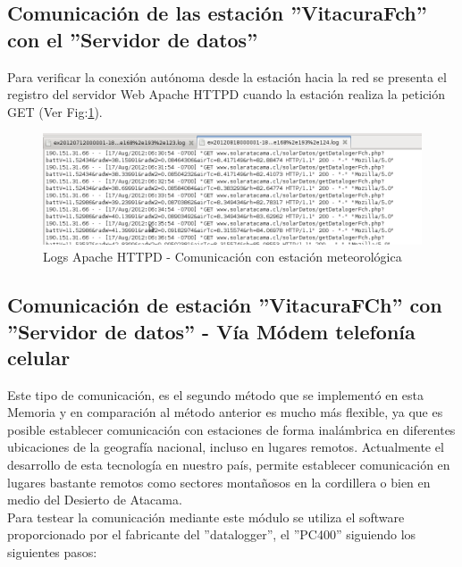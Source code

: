 \subsection{Comunicación de las estación ''VitacuraFch'' con el ''Servidor de datos''}
Para verificar la conexión autónoma desde la estación hacia la red se presenta el registro del servidor Web Apache HTTPD cuando la estación realiza la petición GET (Ver Fig:\ref{pruebasLog1}).

\begin{figure}[h!]
        \centering
        \includegraphics[width=400pt]{images/pruebasLog1}
        \caption{Logs Apache HTTPD - Comunicación con estación meteorológica}
        \label{pruebasLog1}
\end{figure}

\subsection{Comunicación de estación ''VitacuraFCh'' con ''Servidor de datos'' - Vía Módem telefonía celular}
Este tipo de comunicación, es el segundo método que se implementó en esta Memoria y en comparación al método anterior es mucho más flexible, ya que es posible establecer comunicación con estaciones de forma inalámbrica en diferentes ubicaciones de la geografía nacional, incluso en lugares remotos. Actualmente el desarrollo de esta tecnología en nuestro país, permite establecer comunicación en lugares bastante remotos como sectores montañosos en la cordillera o bien en medio del Desierto de Atacama.\\

Para testear la comunicación mediante este módulo se utiliza el software proporcionado por el fabricante del ''datalogger'', el ''PC400'' siguiendo los siguientes pasos:

